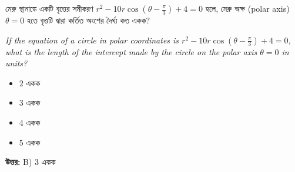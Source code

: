 \documentclass[12pt, a4paper]{article}
\begin{document}
\vspace{2em}

\begin{tcolorbox}[questionbox={প্রশ্ন (Question) 10}]
    \noindent
    মেরু স্থানাঙ্কে একটি বৃত্তের সমীকরণ $r^2 - 10r \cos\left(\theta - \frac{\pi}{3}\right) + 4 = 0$ হলে, মেরু অক্ষ (polar axis) $\theta = 0$ হতে বৃত্তটি দ্বারা কর্তিত অংশের দৈর্ঘ্য কত একক?
    
    \vspace{0.8em}
    \begin{english}
    \noindent\textit{\color{darkgray}
    If the equation of a circle in polar coordinates is $r^2 - 10r \cos\left(\theta - \frac{\pi}{3}\right) + 4 = 0$, what is the length of the intercept made by the circle on the polar axis $\theta = 0$ in units?
    }
    \end{english}
\end{tcolorbox}

\vspace{1em}
\begin{itemize}[label={}, leftmargin=1cm, itemsep=0.5em]
    \item[\textbf{A)}] $2$ একক
    \item[\textbf{B)}] $3$ একক
    \item[\textbf{C)}] $4$ একক
    \item[\textbf{D)}] $5$ একক
\end{itemize}

\vspace{0.5em}
\begin{tcolorbox}[answerbox]
    \textbf{\color{success} উত্তর:} B) $3$ একক
\end{tcolorbox}
\vspace{1em}
\end{document}

